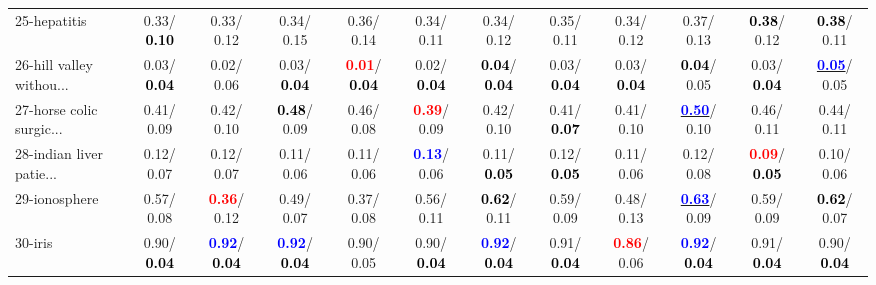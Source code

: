 \begin{table}[h]
\begin{center}
{\begin{tabular}{lc|c|c|c|c|c|c|c|c|c|c}
25-hepatitis &   0.33/\textcolor{black}{\textbf{  0.10}} &   0.33/  0.12 &   0.34/  0.15 &   0.36/  0.14 &   0.34/  0.11 &   0.34/  0.12 &   0.35/  0.11 &   0.34/  0.12 &   0.37/  0.13 & \textcolor{black}{\textbf{  0.38}}/  0.12 & \textcolor{black}{\textbf{  0.38}}/  0.11 \\
26-hill valley withou... &   0.03/\textcolor{black}{\textbf{  0.04}} &   0.02/  0.06 &   0.03/\textcolor{black}{\textbf{  0.04}} & \textcolor{red}{\textbf{  0.01}}/\textcolor{black}{\textbf{  0.04}} &   0.02/\textcolor{black}{\textbf{  0.04}} & \textcolor{black}{\textbf{  0.04}}/\textcolor{black}{\textbf{  0.04}} &   0.03/\textcolor{black}{\textbf{  0.04}} &   0.03/\textcolor{black}{\textbf{  0.04}} & \textcolor{black}{\textbf{  0.04}}/  0.05 &   0.03/\textcolor{black}{\textbf{  0.04}} & \underline{\textcolor{blue}{\textbf{  0.05}}}/  0.05 \\
27-horse colic surgic... &   0.41/  0.09 &   0.42/  0.10 & \textcolor{black}{\textbf{  0.48}}/  0.09 &   0.46/  0.08 & \textcolor{red}{\textbf{  0.39}}/  0.09 &   0.42/  0.10 &   0.41/\textcolor{black}{\textbf{  0.07}} &   0.41/  0.10 & \underline{\textcolor{blue}{\textbf{  0.50}}}/  0.10 &   0.46/  0.11 &   0.44/  0.11 \\
28-indian liver patie... &   0.12/  0.07 &   0.12/  0.07 &   0.11/  0.06 &   0.11/  0.06 & \textcolor{blue}{\textbf{  0.13}}/  0.06 &   0.11/\textcolor{black}{\textbf{  0.05}} &   0.12/\textcolor{black}{\textbf{  0.05}} &   0.11/  0.06 &   0.12/  0.08 & \textcolor{red}{\textbf{  0.09}}/\textcolor{black}{\textbf{  0.05}} &   0.10/  0.06 \\ \hline
29-ionosphere &   0.57/  0.08 & \textcolor{red}{\textbf{  0.36}}/  0.12 &   0.49/  0.07 &   0.37/  0.08 &   0.56/  0.11 & \textcolor{black}{\textbf{  0.62}}/  0.11 &   0.59/  0.09 &   0.48/  0.13 & \underline{\textcolor{blue}{\textbf{  0.63}}}/  0.09 &   0.59/  0.09 & \textcolor{black}{\textbf{  0.62}}/  0.07 \\
30-iris &   0.90/\textcolor{black}{\textbf{  0.04}} & \textcolor{blue}{\textbf{  0.92}}/\textcolor{black}{\textbf{  0.04}} & \textcolor{blue}{\textbf{  0.92}}/\textcolor{black}{\textbf{  0.04}} &   0.90/  0.05 &   0.90/\textcolor{black}{\textbf{  0.04}} & \textcolor{blue}{\textbf{  0.92}}/\textcolor{black}{\textbf{  0.04}} &   0.91/\textcolor{black}{\textbf{  0.04}} & \textcolor{red}{\textbf{  0.86}}/  0.06 & \textcolor{blue}{\textbf{  0.92}}/\textcolor{black}{\textbf{  0.04}} &   0.91/\textcolor{black}{\textbf{  0.04}} &   0.90/\textcolor{black}{\textbf{  0.04}} \\

\end{tabular}}
\end{center}
\end{table}

